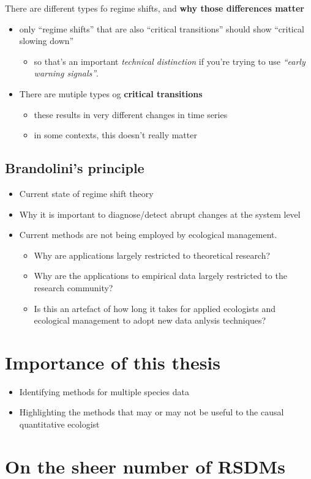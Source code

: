 \documentclass[12pt,twoside]{reedthesis}
\providecommand{\tightlist}{%
  \setlength{\itemsep}{0pt}\setlength{\parskip}{0pt}}
\begin{document}
There are different types fo regime shifts, and \textbf{why those differences matter}
\begin{itemize}
\tightlist
\item
  only ``regime shifts'' that are also ``critical transitions'' should show ``critical slowing down''
  \begin{itemize}
  \tightlist
  \item
    so that's an important \emph{technical distinction} if you're trying to use \emph{``early warning signals''}.\\
  \end{itemize}
\item
  There are mutiple types og \textbf{critical transitions}
  \begin{itemize}
  \tightlist
  \item
    these results in very different changes in time series\\
  \item
    in some contexts, this doesn't really matter
  \end{itemize}
\end{itemize}
\hypertarget{brandolinis-principle}{%
\subsection{Brandolini's principle}\label{brandolinis-principle}}
\begin{itemize}
\tightlist
\item
  Current state of regime shift theory
\item
  Why it is important to diagnose/detect abrupt changes at the system level
\item
  Current methods are not being employed by ecological management.
  \begin{itemize}
  \tightlist
  \item
    Why are applications largely restricted to theoretical research?
  \item
    Why are the applications to empirical data largely restricted to the research community?
  \item
    Is this an artefact of how long it takes for applied ecologists and ecological management to adopt new data anlysis techniques?
  \end{itemize}
\end{itemize}
\hypertarget{importance-of-this-thesis}{%
\section{Importance of this thesis}\label{importance-of-this-thesis}}
\begin{itemize}
\tightlist
\item
  Identifying methods for multiple species data
\item
  Highlighting the methods that may or may not be useful to the causal quantitative ecologist
\end{itemize}
\hypertarget{on-the-sheer-number-of-rsdms}{%
\section{On the sheer number of RSDMs}\label{on-the-sheer-number-of-rsdms}}
\end{document}
